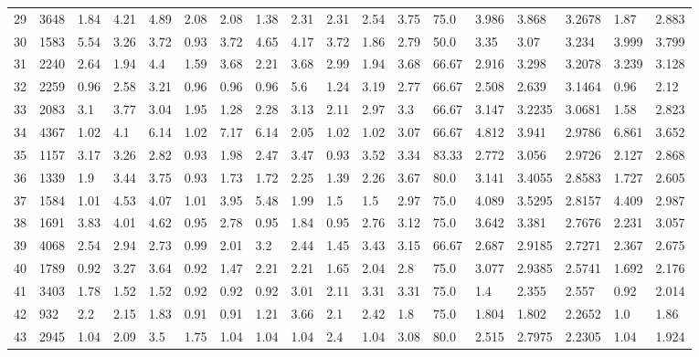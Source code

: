 \documentclass[landscape, 10pt]{report}
\begin{document}
\begin{longtable}{l || l || l | l | l | l | l | l | l | l | l | l | l || l | l | l | l | l}
\rowcolor{lightgray}29 & 3648 & 1.84 & 4.21 & 4.89 & 2.08 & 2.08 & 1.38 & 2.31 & 2.31 & 2.54 & 3.75 & 75.0 & 3.986 & 3.868 & 3.2678 & 1.87 & 2.883\\ 
30 & 1583 & 5.54 & 3.26 & 3.72 & 0.93 & 3.72 & 4.65 & 4.17 & 3.72 & 1.86 & 2.79 & 50.0 & 3.35 & 3.07 & 3.234 & 3.999 & 3.799\\ 
\rowcolor{lightgray}31 & 2240 & 2.64 & 1.94 & 4.4 & 1.59 & 3.68 & 2.21 & 3.68 & 2.99 & 1.94 & 3.68 & 66.67 & 2.916 & 3.298 & 3.2078 & 3.239 & 3.128\\ 
32 & 2259 & 0.96 & 2.58 & 3.21 & 0.96 & 0.96 & 0.96 & 5.6 & 1.24 & 3.19 & 2.77 & 66.67 & 2.508 & 2.639 & 3.1464 & 0.96 & 2.12\\ 
\rowcolor{lightgray}33 & 2083 & 3.1 & 3.77 & 3.04 & 1.95 & 1.28 & 2.28 & 3.13 & 2.11 & 2.97 & 3.3 & 66.67 & 3.147 & 3.2235 & 3.0681 & 1.58 & 2.823\\ 
34 & 4367 & 1.02 & 4.1 & 6.14 & 1.02 & 7.17 & 6.14 & 2.05 & 1.02 & 1.02 & 3.07 & 66.67 & 4.812 & 3.941 & 2.9786 & 6.861 & 3.652\\ 
\rowcolor{lightgray}35 & 1157 & 3.17 & 3.26 & 2.82 & 0.93 & 1.98 & 2.47 & 3.47 & 0.93 & 3.52 & 3.34 & 83.33 & 2.772 & 3.056 & 2.9726 & 2.127 & 2.868\\ 
36 & 1339 & 1.9 & 3.44 & 3.75 & 0.93 & 1.73 & 1.72 & 2.25 & 1.39 & 2.26 & 3.67 & 80.0 & 3.141 & 3.4055 & 2.8583 & 1.727 & 2.605\\ 
\rowcolor{lightgray}37 & 1584 & 1.01 & 4.53 & 4.07 & 1.01 & 3.95 & 5.48 & 1.99 & 1.5 & 1.5 & 2.97 & 75.0 & 4.089 & 3.5295 & 2.8157 & 4.409 & 2.987\\ 
38 & 1691 & 3.83 & 4.01 & 4.62 & 0.95 & 2.78 & 0.95 & 1.84 & 0.95 & 2.76 & 3.12 & 75.0 & 3.642 & 3.381 & 2.7676 & 2.231 & 3.057\\ 
\rowcolor{lightgray}39 & 4068 & 2.54 & 2.94 & 2.73 & 0.99 & 2.01 & 3.2 & 2.44 & 1.45 & 3.43 & 3.15 & 66.67 & 2.687 & 2.9185 & 2.7271 & 2.367 & 2.675\\ 
40 & 1789 & 0.92 & 3.27 & 3.64 & 0.92 & 1.47 & 2.21 & 2.21 & 1.65 & 2.04 & 2.8 & 75.0 & 3.077 & 2.9385 & 2.5741 & 1.692 & 2.176\\ 
\rowcolor{lightgray}41 & 3403 & 1.78 & 1.52 & 1.52 & 0.92 & 0.92 & 0.92 & 3.01 & 2.11 & 3.31 & 3.31 & 75.0 & 1.4 & 2.355 & 2.557 & 0.92 & 2.014\\ 
42 & 932 & 2.2 & 2.15 & 1.83 & 0.91 & 0.91 & 1.21 & 3.66 & 2.1 & 2.42 & 1.8 & 75.0 & 1.804 & 1.802 & 2.2652 & 1.0 & 1.86\\ 
\rowcolor{lightgray}43 & 2945 & 1.04 & 2.09 & 3.5 & 1.75 & 1.04 & 1.04 & 1.04 & 2.4 & 1.04 & 3.08 & 80.0 & 2.515 & 2.7975 & 2.2305 & 1.04 & 1.924\\ 

\end{longtable}
\end{document}

